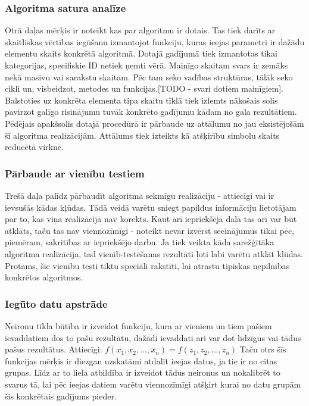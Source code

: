 \subsubsection{Algoritma satura analīze}
Otrā daļas mērķis ir noteikt kas par algoritmu ir dotais. Tas tiek darīts ar skaitliskas vērtības iegūšanu izmantojot funkciju, kuras ieejas parametri ir dažādu elementu skaits konkrētā algoritmā. Dotajā gadījumā tiek izmantotas tikai kategorijas, specifiskie ID netiek ņemti vērā. Mainīgo skaitam svars ir zemāks nekā masīvu vai sarakstu skaitam. Pēc tam seko vadības struktūras, tālāk seko cikli un, visbeidzot, metodes un funkcijas.[TODO - svari dotiem mainīgiem]. Balstoties uz konkrēta elementa tipa skaitu tīklā tiek izlemts nākošais solis pavirzot galīgo risinājumu tuvāk konkrēto gadījumu kādam no gala rezultātiem. Pēdējais apakšsolis dotajā procedūrā ir pārbaude uz attālumu no jau eksistējošām šī algoritma realizācijām. Attālums tiek izteikts kā atšķirību simbolu skaits reducētā virknē.

\subsubsection{Pārbaude ar vienību testiem}
Trešā daļa palīdz pārbaudīt algoritma sekmīgu realizāciju - attiecīgi vai ir ievsušās kādas kļūdas. Tādā veidā varētu sniegt papildus informāciju lietotājam par to, kas viņa realizācijā nav korekts. Kaut arī iepriekšējā daļā tas arī var būt atklāts, taču tas nav viennozīmīgi - noteikt nevar izvērst secinājumus tikai pēc, piemēram, sakritības ar iepriekšējo darbu. Ja tiek veikta kāda sarežģītāka algoritma realizācija, tad vienīb-testēšanas rezultāti ļoti labi varētu atklāt kļūdas. Protams, šie vienību testi tiktu speciāli rakstīti, lai atrastu tipiskas nepilnības konkrētos algoritmos.

\subsubsection{Iegūto datu apstrāde}
Neironu tīkla būtība ir izveidot funkciju, kura ar vieniem un tiem pašiem ievaddatiem dos to pašu rezultātu, dažādi ievaddati ari var dot līdzīgus vai tādus pašus rezultātus. Attiecīgi: \begin{math}f(x_1, x_2, ..., x_n) = f(z_1, z_2, ..., z_n)\end{math}
Taču otrs šīs funkcijas mērķis ir diezgan uzskatāmi atdalīt ieejas datus, ja tie ir no citas grupas. Līdz ar to liela atbildība ir izveidot tādus neironus un nokalibrēt to svarus tā, lai pēc ieejas datiem varētu viennozīmīgi atšķirt kurai no datu grupām šis konkrētais gadījums pieder.

